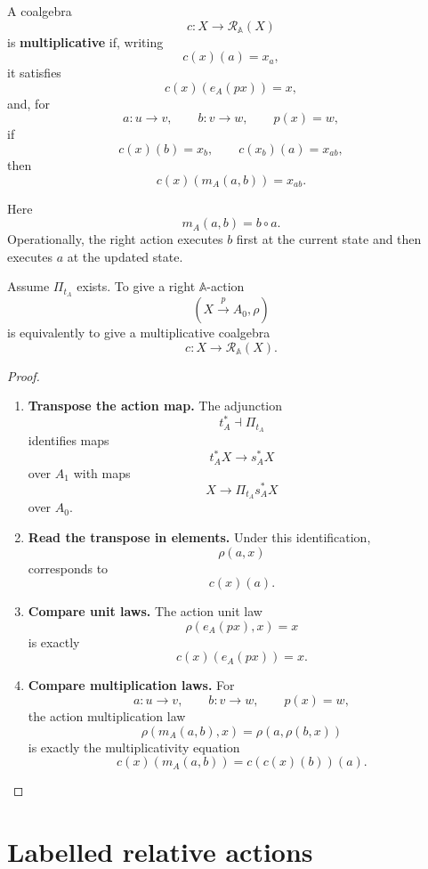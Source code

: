 \begin{definition}
\label{def:poly-relative-multiplicative-action-coalgebra}
A coalgebra
\[
c:X\to\mathcal R_{\mathbb A}(X)
\]
is \textbf{multiplicative} if, writing
\[
c(x)(a)=x_a,
\]
it satisfies
\[
c(x)(e_A(px))=x,
\]
and, for
\[
a:u\to v,
\qquad
b:v\to w,
\qquad
p(x)=w,
\]
if
\[
c(x)(b)=x_b,
\qquad
c(x_b)(a)=x_{ab},
\]
then
\[
c(x)(m_A(a,b))=x_{ab}.
\]
\end{definition}

Here
\[
m_A(a,b)=b\circ a.
\]
Operationally, the right action executes \(b\) first at the current state and
then executes \(a\) at the updated state.

\begin{proposition}
\label{prop:poly-relative-actions-as-response-coalgebras}
Assume \(\Pi_{t_A}\) exists.  To give a right \(\mathbb A\)-action
\[
(X\xrightarrow{p}A_0,\rho)
\]
is equivalently to give a multiplicative coalgebra
\[
c:X\to\mathcal R_{\mathbb A}(X).
\]
\end{proposition}

\begin{proof}
\leavevmode
\begin{enumerate}
\item \textbf{Transpose the action map.}
The adjunction
\[
t_A^\ast\dashv\Pi_{t_A}
\]
identifies maps
\[
t_A^\ast X\to s_A^\ast X
\]
over \(A_1\) with maps
\[
X\to\Pi_{t_A}s_A^\ast X
\]
over \(A_0\).

\item \textbf{Read the transpose in elements.}
Under this identification,
\[
\rho(a,x)
\]
corresponds to
\[
c(x)(a).
\]

\item \textbf{Compare unit laws.}
The action unit law
\[
\rho(e_A(px),x)=x
\]
is exactly
\[
c(x)(e_A(px))=x.
\]

\item \textbf{Compare multiplication laws.}
For
\[
a:u\to v,
\qquad
b:v\to w,
\qquad
p(x)=w,
\]
the action multiplication law
\[
\rho(m_A(a,b),x)=\rho(a,\rho(b,x))
\]
is exactly the multiplicativity equation
\[
c(x)(m_A(a,b))=c(c(x)(b))(a).
\]
\end{enumerate}
\end{proof}

\section{Labelled relative actions}
\label{sec:poly-relative-labelled-actions}

